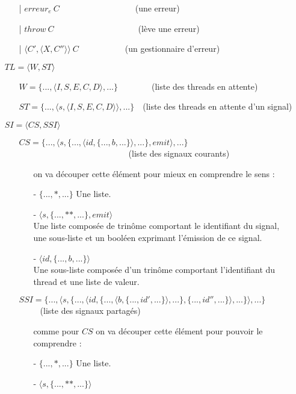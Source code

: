 \documentclass[10pt,a4paper]{report}
\begin{document}
\begin{itemize}
\begin{itemize}
			\item[|] $erreur_{e}~C$~~~~~~~~~~~~~~~~~~(une erreur)
			\item[|] $throw~C$~~~~~~~~~~~~~~~~~~~~(lève une erreur)
			\item[|] $\langle C',\langle X,C''\rangle\rangle~C$~~~~~~~~~~~(un gestionnaire d'erreur)
		\end{itemize}
		\item[] $TL = \langle W,ST\rangle$
		\begin{itemize}
			\item[] $W = \{...,\langle I,S,E,C,D\rangle,...\}$~~~~~~~~(liste des threads en attente)
			\item[] $ST = \{...,\langle s,\langle I,S,E,C,D\rangle\rangle,...\}$~~(liste des threads en attente d'un signal)
		\end{itemize}
		\item[] $SI = \langle CS,SSI\rangle$
		\begin{itemize}
			\item[] $CS = \{...,\langle s,\{...,\langle id,\{...,b,...\}\rangle,...\},emit\rangle,...\}$~~~~~~~~~~~~~~~~~~~~~~~~~~(liste des signaux courants)
			\begin{itemize}
				\item[] on va découper cette élément pour mieux en comprendre le sens :
				\item[] - $\{...,*,...\}$ Une liste. 
				\item[] - $\langle s,\{...,**,...\},emit\rangle$ \\
				Une liste composée de trinôme comportant le identifiant du signal, une sous-liste et un booléen exprimant l'émission de ce signal.
				\item[] - $\langle id,\{...,b,...\}\rangle$ \\
				Une sous-liste composée d'un trinôme comportant l'identifiant du thread et une liste de valeur.
			\end{itemize}
			\item[]
			\item[] $SSI =  \{...,\langle s,\{...,\langle id,\{...,\langle b,\{...,id',...\}\rangle,...\},\{...,id'',...\}\rangle,...\}\rangle,...\}$~~~~~(liste des signaux partagés)
			\begin{itemize}
				\item[] comme pour $CS$ on va découper cette élément pour pouvoir le comprendre :
				\item[] - $\{...,*,...\}$ Une liste. 
				\item[] - $\langle s,\{...,**,...\}\rangle$\\

\end{itemize}
\end{itemize}
\end{itemize}
\end{document}
